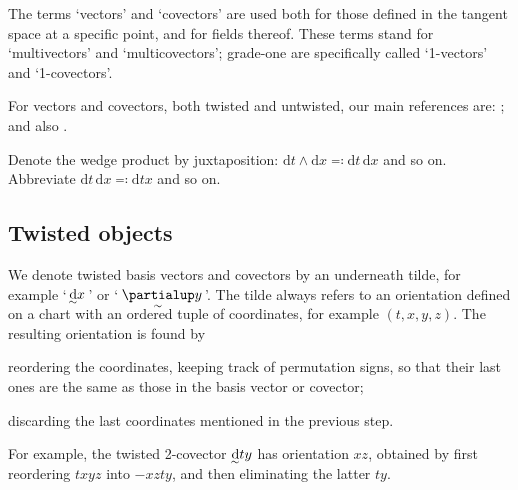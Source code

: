 \documentclass[\ifafour a4paper,12pt,\else a5paper,10pt,\fi%
onecolumn,oneside,article,%
british%
]{memoir}
\theoremstyle{remark}
\theoremstyle{innote}
\newcommand*{\de}{\partialup}%
\newcommand*{\di}{\mathrm{d}}%
\newcommand*{\defs}{\eqqcolon}
\renewcommand*{\|}[1][]{\nonscript\:#1\vert\nonscript\:\mathopen{}}
\newcommand*{\chap}{ch.}%
\newcommand*{\chaps}{chs}%
\newcommand*{\tw}[2][\scriptstyle\sim]{\smash[b]{\underset{\mathclap{{}^{#1}}}{#2}}}
\newcommand*{\ti}[1][\scriptstyle\sim]{\tw[#1]{\di}}
\newcommand*{\te}[1][\scriptstyle\sim]{\tw[#1]{\de}}
\begin{document}

The terms \enquote*{vectors} and \enquote*{covectors} are used both for those defined in the tangent space at a specific point, and for fields thereof. These terms stand for \enquote*{multivectors} and \enquote*{multicovectors}; grade-one are specifically called \enquote*{1-vectors} and \enquote*{1-covectors}.

For vectors and covectors, both twisted and untwisted, our main references are: \cites[esp.\ \chap~IV]{burke1985_r1987}[esp.\ \chaps~2--3]{bossavit1991}[esp.\ part~F]{truesdelletal1960}; and also \cites{burke1995,burke1995b}.

Denote the wedge product by juxtaposition: $\di t \land \di x \defs \di t\, \di x$ and so on. Abbreviate $\di t\, \di x \defs \di tx$ and so on.

\subsection{Twisted objects}
\label{sec:twisted}

We denote twisted basis vectors and covectors by an underneath tilde, for example \enquote*{\,$\ti x$\,} or \enquote*{\,$\te y$\,}. The tilde always refers to an orientation defined on a chart with an ordered tuple of coordinates, for example $(t,x,y,z)$. The resulting orientation is found by
\begin{enumerate*}[label=(\roman*)]
\item reordering the coordinates, keeping track of permutation signs, so that their last ones are the same as those in the basis vector or covector;
\item discarding the last coordinates mentioned in the previous step.
\end{enumerate*}
For example, the twisted 2-covector $\ti ty$ has orientation $xz$, obtained by first reordering $txyz$ into $-xzty$, and then eliminating the latter $ty$.
\end{document}
